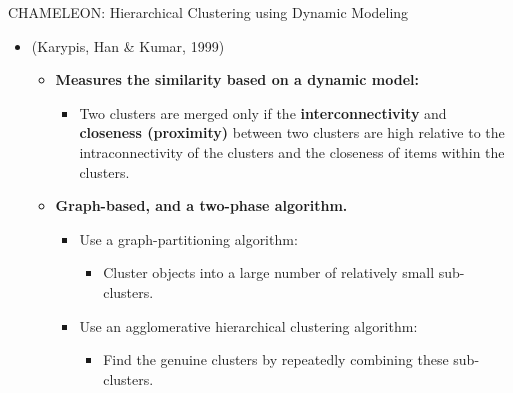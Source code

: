 \begin{frame}{CHAMELEON: Hierarchical Clustering using Dynamic Modeling}
	\begin{itemize}
		\item (Karypis, Han \& Kumar, 1999)
		      \begin{itemize}
			      \item \textbf{Measures the similarity based on a dynamic model:}
			            \begin{itemize}
				            \item Two clusters are merged only if the
				                  \textbf{interconnectivity} and \textbf{closeness (proximity)}
				                  between two clusters are high relative to the intraconnectivity
				                  of the clusters and the closeness of items within the clusters.
			            \end{itemize}
			      \item \textbf{Graph-based, and a two-phase algorithm.}
			            \begin{itemize}
				            \item Use a graph-partitioning algorithm:
				                  \begin{itemize}
					                  \item Cluster objects into a large number of relatively
					                        small sub-clusters.
				                  \end{itemize}
				            \item Use an agglomerative hierarchical clustering algorithm:
				                  \begin{itemize}
					                  \item Find the genuine clusters by repeatedly combining
					                        these sub-clusters.
				                  \end{itemize}
			            \end{itemize}
		      \end{itemize}
	\end{itemize}
\end{frame}

